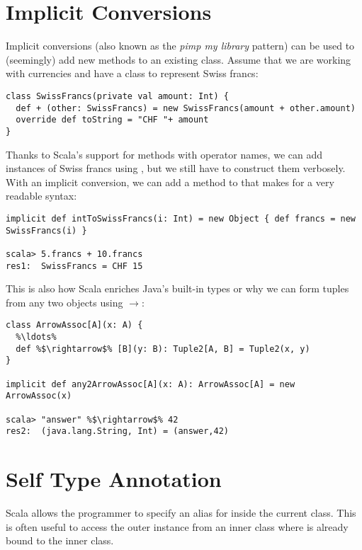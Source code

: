 \documentclass[10pt,a4paper,oneside]{scrreprt}
\begin{document}
\section{Implicit Conversions} \label{section:implicit-conversions}

Implicit conversions (also known as the \textit{pimp my library} pattern) can be used to (seemingly) add new methods to an existing class. Assume that we are working with currencies and have a class to represent Swiss francs:

\begin{lstlisting}
class SwissFrancs(private val amount: Int) {
  def + (other: SwissFrancs) = new SwissFrancs(amount + other.amount)
  override def toString = "CHF "+ amount
}
\end{lstlisting}

Thanks to Scala's support for methods with operator names, we can add instances of Swiss francs using \src{+}, but we still have to construct them verbosely. With an implicit conversion, we can add a  method to  that makes for a very readable syntax:

\begin{lstlisting}
implicit def intToSwissFrancs(i: Int) = new Object { def francs = new SwissFrancs(i) }

scala> 5.francs + 10.francs
res1:  SwissFrancs = CHF 15
\end{lstlisting}

This is also how Scala enriches Java's built-in types or why we can form tuples from any two objects using $\rightarrow$:

\begin{lstlisting}
class ArrowAssoc[A](x: A) {
  %\ldots%
  def %$\rightarrow$% [B](y: B): Tuple2[A, B] = Tuple2(x, y)
}

implicit def any2ArrowAssoc[A](x: A): ArrowAssoc[A] = new ArrowAssoc(x)

scala> "answer" %$\rightarrow$% 42
res2:  (java.lang.String, Int) = (answer,42)
\end{lstlisting}

\section{Self Type Annotation} \label{section:self-type-annotation}

Scala allows the programmer to specify an alias for  inside the current class. This is often useful to access the outer instance from an inner class where  is already bound to the inner class. 
\end{document}
